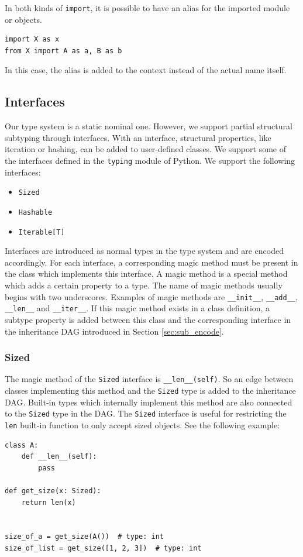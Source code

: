 In both kinds of \lstinline|import|, it is possible to have an alias for the imported module or objects.
\begin{lstlisting}
import X as x
from X import A as a, B as b
\end{lstlisting}
In this case, the alias is added to the context instead of the actual name itself.

\subsection{Interfaces}
Our type system is a static nominal one. However, we support partial structural subtyping through interfaces. With an interface, structural properties, like iteration or hashing, can be added to user-defined classes. We support some of the interfaces defined in the \lstinline|typing| module of Python. We support the following interfaces:
\begin{itemize}
\item \lstinline|Sized|
\item \lstinline|Hashable|
\item \lstinline|Iterable[T]|
\end{itemize}

Interfaces are introduced as normal types in the type system and are encoded accordingly. For each interface, a corresponding magic method must be present in the class which implements this interface. A magic method is a special method which adds a certain property to a type. The name of magic methods usually begins with two underscores. Examples of magic methods are \lstinline|__init__|, \lstinline|__add__|, \lstinline|__len__| and \lstinline|__iter__|. If this magic method exists in a class definition, a subtype property is added between this class and the corresponding interface in the inheritance DAG introduced in Section \ref{sec:sub_encode}.

\subsubsection{Sized}
The magic method of the \lstinline|Sized| interface is \lstinline|__len__(self)|. So an edge between classes implementing this method and the \lstinline|Sized| type is added to the inheritance DAG. Built-in types which internally implement this method are also connected to the \lstinline|Sized| type in the DAG. The \lstinline|Sized| interface is useful for restricting the \lstinline|len| built-in function to only accept sized objects. See the following example:
\begin{lstlisting}
class A:
	def __len__(self):
		pass
		
def get_size(x: Sized):
	return len(x)
	

size_of_a = get_size(A())  # type: int
size_of_list = get_size([1, 2, 3])  # type: int
\end{lstlisting}

